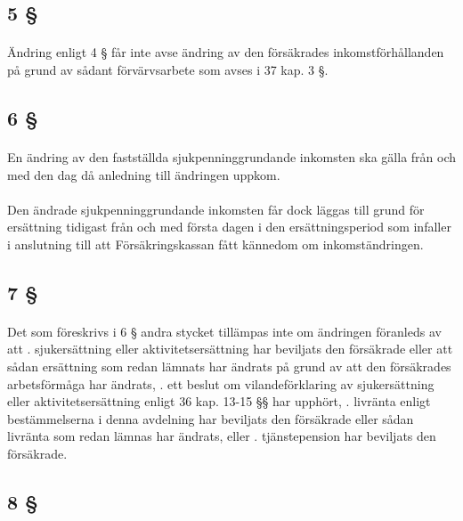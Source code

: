 \documentclass[a4paper,notitlepage,openany,10pt]{book}
\begin{document}
\subsection*{5 §}
\paragraph*{}
Ändring enligt 4 § får inte avse ändring av den försäkrades inkomstförhållanden på grund av sådant förvärvsarbete som avses i 37 kap. 3 §.
\subsection*{6 §}
\paragraph*{}
En ändring av den fastställda sjukpenninggrundande inkomsten ska gälla från och med den dag då anledning till ändringen uppkom.
\paragraph*{}
Den ändrade sjukpenninggrundande inkomsten får dock läggas till grund för ersättning tidigast från och med första dagen i den ersättningsperiod som infaller i anslutning till att Försäkringskassan fått kännedom om inkomständringen.
\subsection*{7 §}
\paragraph*{}
Det som föreskrivs i 6 § andra stycket tillämpas inte om ändringen föranleds av att
. sjukersättning eller aktivitetsersättning har beviljats den försäkrade eller att sådan ersättning som redan lämnats har ändrats på grund av att den försäkrades arbetsförmåga har ändrats,
. ett beslut om vilandeförklaring av sjukersättning eller aktivitetsersättning enligt 36 kap. 13-15 §§ har upphört,
. livränta enligt bestämmelserna i denna avdelning har beviljats den försäkrade eller sådan livränta som redan lämnas har ändrats, eller
. tjänstepension har beviljats den försäkrade.
\subsection*{8 §}
\end{document}
